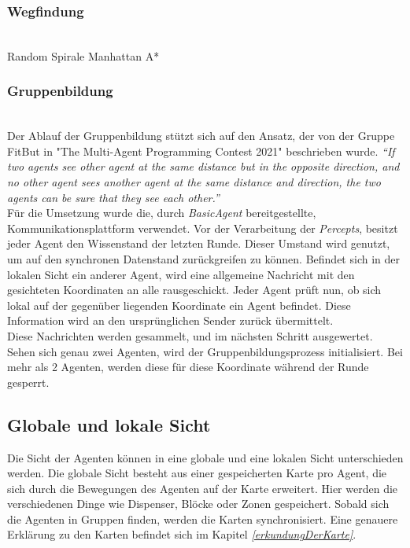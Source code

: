 \subsubsection{Wegfindung} \label{kap:wegfindung} ~\\
Random \newline
Spirale \newline
Manhattan \newline
A*

\subsubsection{Gruppenbildung} \label{kap:Gruppenbildung} ~\\

Der Ablauf der Gruppenbildung stützt sich auf den Ansatz, der von der Gruppe FitBut in "The Multi-Agent Programming Contest 2021" beschrieben wurde. \textit{ “If two agents see other agent at the same distance but in the opposite direction, and no other agent sees another agent at the same distance and direction, the two agents can be sure that they see each other.” } \cite{ref_book1}  \\

Für die Umsetzung wurde die, durch \textit{BasicAgent}  bereitgestellte, Kommunikationsplattform verwendet. Vor der Verarbeitung der \textit{Percepts}, besitzt jeder Agent den Wissenstand der letzten Runde. Dieser Umstand wird genutzt, um auf den synchronen Datenstand zurückgreifen zu können. Befindet sich in der lokalen Sicht ein anderer Agent, wird eine allgemeine Nachricht mit den gesichteten Koordinaten an alle rausgeschickt. Jeder Agent prüft nun, ob sich lokal auf der gegenüber liegenden Koordinate ein Agent befindet. Diese Information wird an den ursprünglichen Sender zurück übermittelt.  \\

Diese Nachrichten werden gesammelt, und im nächsten Schritt ausgewertet. Sehen sich genau zwei Agenten, wird der Gruppenbildungsprozess initialisiert. Bei mehr als 2 Agenten, werden diese für diese Koordinate während der Runde gesperrt. \\


\subsection{Globale und lokale Sicht}
Die Sicht der Agenten können in eine globale und eine lokalen Sicht unterschieden werden. Die globale Sicht besteht aus einer gespeicherten Karte pro Agent, die sich durch die Bewegungen des Agenten auf der Karte erweitert. Hier werden die verschiedenen Dinge wie Dispenser, Blöcke oder Zonen gespeichert. Sobald sich die Agenten in Gruppen finden, werden die Karten synchronisiert. Eine genauere Erklärung zu den Karten befindet sich im Kapitel \textit{\ref{erkundungDerKarte}}.\\

